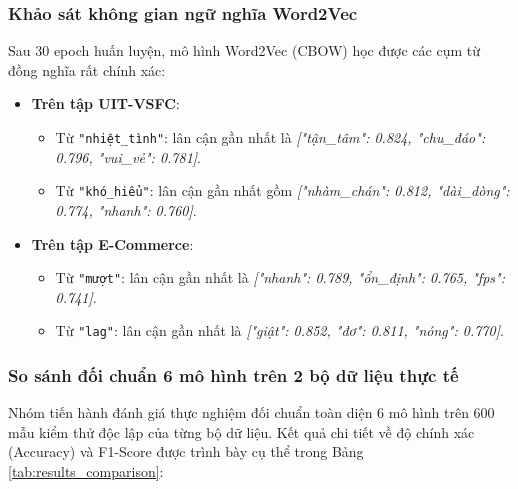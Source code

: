 \documentclass[12pt,a4paper]{article}
\begin{document}
\subsubsection{Khảo sát không gian ngữ nghĩa Word2Vec}\label{sec:word2vec_semantic_eval}
Sau 30 epoch huấn luyện, mô hình Word2Vec (CBOW) học được các cụm từ đồng nghĩa rất chính xác:
\begin{itemize}[leftmargin=1.0cm, itemsep=2pt]
    \item[--] \textbf{Trên tập UIT-VSFC}:
    \begin{itemize}[leftmargin=0.6cm, itemsep=1pt]
        \item Từ \texttt{"nhiệt\_tình"}: lân cận gần nhất là \textit{["tận\_tâm": 0.824, "chu\_đáo": 0.796, "vui\_vẻ": 0.781]}.
        \item Từ \texttt{"khó\_hiểu"}: lân cận gần nhất gồm \textit{["nhàm\_chán": 0.812, "dài\_dòng": 0.774, "nhanh": 0.760]}.
    \end{itemize}
    \item[--] \textbf{Trên tập E-Commerce}:
    \begin{itemize}[leftmargin=0.6cm, itemsep=1pt]
        \item Từ \texttt{"mượt"}: lân cận gần nhất là \textit{["nhanh": 0.789, "ổn\_định": 0.765, "fps": 0.741]}.
        \item Từ \texttt{"lag"}: lân cận gần nhất là \textit{["giật": 0.852, "đơ": 0.811, "nóng": 0.770]}.
    \end{itemize}
\end{itemize}

\subsubsection{So sánh đối chuẩn 6 mô hình trên 2 bộ dữ liệu thực tế}\label{sec:model_benchmark_results}
Nhóm tiến hành đánh giá thực nghiệm đối chuẩn toàn diện 6 mô hình trên 600 mẫu kiểm thử độc lập của từng bộ dữ liệu. Kết quả chi tiết về độ chính xác (Accuracy) và F1-Score được trình bày cụ thể trong Bảng \ref{tab:results_comparison}:
\end{document}
